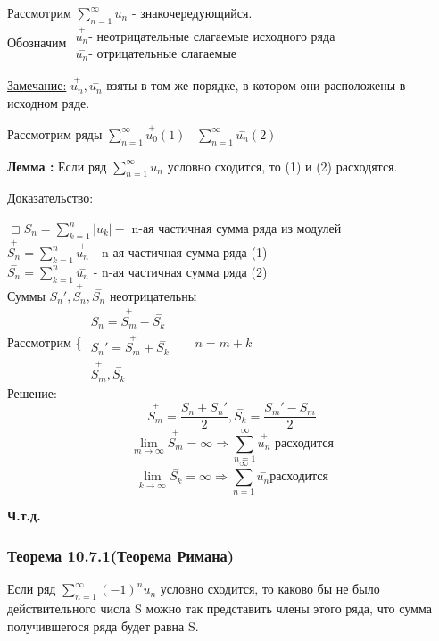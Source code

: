 \documentclass[12pt]{article}
\let\oldsum\sum
\let\oldlim\lim
\renewcommand{\sum}{\oldsum\limits}
\renewcommand{\lim}{\oldlim\limits}
\begin{document}
  Рассмотрим $\sum_{n=1}^{\infty} u_n$ - знакочередующийся. \\
  Обозначим $
  \begin{matrix}
    \overset{+}{u_n} \text{-  неотрицательные слагаемые исходного ряда}\\
    \overset{-}{u_n} \text{- отрицательные слагаемые}
  \end{matrix}$

  \underline{Замечание:} $\overset{+}{u_n},\overset{-}{u_n}$ взяты в том же порядке, в котором они расположены
  в исходном ряде.

  Рассмотрим ряды $\sum_{n=1}^{\infty} \overset{+}{u_0}(1) \hspace{10pt} \sum_{n=1}^{\infty}\overset{-}{u_n}(2)$
  
  \textbf{Лемма :} Если ряд $\sum_{n=1}^{\infty} u_n$ условно сходится, то (1) и (2) расходятся.

  \underline{Доказательство:}
  \begin{adjustwidth}{1.5em}{1.5em}
    $\sqsupset S_n = \sum_{k=1}^{n} |u_k| -$ n-ая частичная сумма ряда из модулей\\
    $\overset{+}{S_n} = \sum_{k=1}^{n} \overset{+}{u_n}$ - n-ая частичная сумма ряда (1)\\
    $\overset{-}{S_n} = \sum_{k=1}^{n} \overset{-}{u_n}$ - n-ая частичная сумма ряда (2)\\
    Суммы $S_n',\overset{+}{S_n}, \overset{-}{S_n}$ неотрицательны\\
    Рассмотрим \Bigg\{
    $
    \begin{matrix}
      S_n = \overset{+}{S_m} - \overset{-}{S_k}\\
      S_n'=\overset{+}{S_m} + \overset{-}{S_k}\\
      \overset{+}{S_m}, \overset{-}{S_k}
    \end{matrix}
    \hspace{20pt}  n=m+k$\\
    Решение: 
    \[\overset{+}{S_m} = \frac{S_n+S_n'}{2}, \overset{-}{S_k} = \frac{S_m'-S_m}{2}\]
    \[\lim_{m \to \infty} \overset{+}{S_m} = \infty \Rightarrow \sum_{n=1}^{\infty} \overset{+}{u_n} \text{ расходится}\]
    \[\lim_{k \to \infty} \overset{-}{S_k} = \infty \Rightarrow  \sum_{n=1}^{\infty} \overset{-}{u_n} \text{расходится}\]
  \end{adjustwidth}
  \begin{center}
    \textbf{Ч.т.д.}
  \end{center}

  \subsubsection*{Теорема 10.7.1(Теорема Римана)}\label{th:10.7.1}
  \par\noindent
  Если ряд $\sum_{n=1}^{\infty} (-1)^n u_n$ условно сходится, то каково бы не было действительного числа
  S можно так представить члены этого ряда, что сумма получившегося ряда будет равна S.
\end{document}
